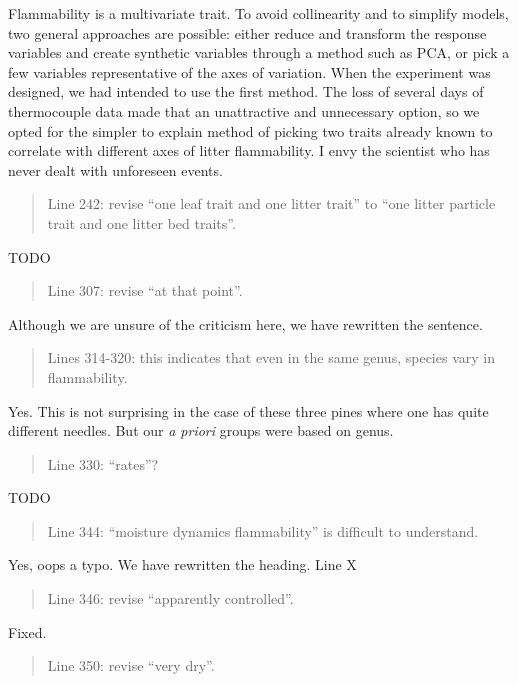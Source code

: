 \documentclass[letterpaper, 12pt]{letter}
\begin{document}
\begin{letter}{}
Flammability is a multivariate trait. To avoid collinearity and to simplify
models, two general approaches are possible: either reduce and transform the
response variables and create synthetic variables through a method such as PCA,
or pick a few variables representative of the axes of variation. When the
experiment was designed, we had intended to use the first method. The loss of
several days of thermocouple data made that an unattractive and unnecessary
option, so we opted for the simpler to explain method of picking two traits
already known to correlate with different axes of litter flammability. I envy
the scientist who has never dealt with unforeseen events.

\begin{quote}
Line 242: revise “one leaf trait and one litter trait” to “one litter particle trait and one litter bed traits”.
\end{quote}

TODO


\begin{quote}
Line 307: revise “at that point”.
\end{quote}

Although we are unsure of the criticism here, we have rewritten the sentence.

\begin{quote}
Lines 314-320: this indicates that even in the same genus, species vary in flammability.
\end{quote}

Yes.  This is not surprising in the case of these three pines where one has quite different needles. But our \emph{a priori} groups were based on genus.

\begin{quote}
Line 330: “rates”?
\end{quote}

TODO

\begin{quote}
Line 344: “moisture dynamics flammability” is difficult to understand.
\end{quote}

Yes, oops a typo. We have rewritten the heading. Line X

\begin{quote}
Line 346: revise “apparently controlled”.
\end{quote}

Fixed.

\begin{quote}
Line 350: revise “very dry”.
\end{quote}


\end{letter}
\end{document}
